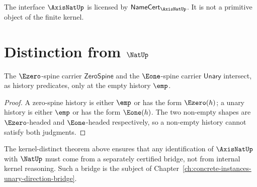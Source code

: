 \begin{corollary}
\label{cor:axisnatup-licensed-not-primitive}
The interface \(\AxisNatUp\) is licensed by \(\mathsf{NameCert}_{\AxisNatUp}\). It is not a primitive object of the finite kernel.
\end{corollary}

\section{Distinction from \(\NatUp\)}

\begin{theorem}
\label{thm:axisnat-natup-kernel-distinct}
The \(\Ezero\)-spine carrier \(\mathsf{ZeroSpine}\) and the \(\Eone\)-spine carrier \(\mathsf{Unary}\) intersect, as history predicates, only at the empty history \(\emp\).
\end{theorem}

\begin{proof}
A zero-spine history is either \(\emp\) or has the form \(\Ezero(h)\); a unary history is either \(\emp\) or has the form \(\Eone(h)\). The two non-empty shapes are \(\Ezero\)-headed and \(\Eone\)-headed respectively, so a non-empty history cannot satisfy both judgments.
\end{proof}

\begin{remark}
The kernel-distinct theorem above ensures that any identification of \(\AxisNatUp\) with \(\NatUp\) must come from a separately certified bridge, not from internal kernel reasoning. Such a bridge is the subject of Chapter~\ref{ch:concrete-instances-unary-direction-bridge}.
\end{remark}

